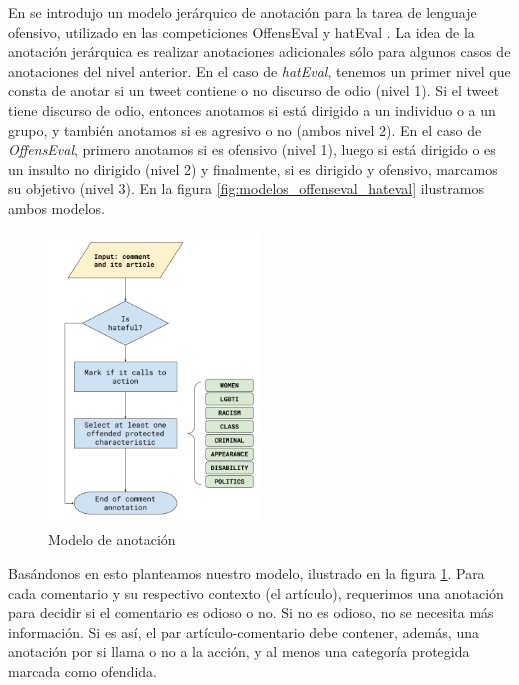 En \citet{zampieri2019predicting} se introdujo un modelo jerárquico de anotación para la tarea de lenguaje ofensivo, utilizado en las competiciones OffensEval \cite{zampieri2019semeval2019} y hatEval \cite{hateval2019semeval}. La idea de la anotación jerárquica es realizar anotaciones adicionales sólo para algunos casos de anotaciones del nivel anterior. En el caso de \emph{hatEval}, tenemos un primer nivel que consta de anotar si un tweet contiene o no discurso de odio (nivel 1). Si el tweet tiene discurso de odio, entonces anotamos si está dirigido a un individuo o a un grupo, y también anotamos si es agresivo o no (ambos nivel 2). En el caso de \emph{OffensEval}, primero anotamos si es ofensivo (nivel 1), luego si está dirigido o es un insulto no dirigido (nivel 2) y finalmente, si es dirigido y ofensivo, marcamos su objetivo (nivel 3). En la figura \ref{fig:modelos_offenseval_hateval} ilustramos ambos modelos.


%
%
%



\begin{figure}
    \centering
    \includegraphics[width=0.5\textwidth]{img/Annotation Model.png}
    \caption{Modelo de anotación}
    \label{fig:annotation_model}
\end{figure}


Basándonos en esto planteamos nuestro modelo, ilustrado en la figura \ref{fig:annotation_model}. Para cada comentario y su respectivo contexto (el artículo), requerimos una anotación para decidir si el comentario es odioso o no. Si no es odioso, no se necesita más información. Si es así, el par artículo-comentario debe contener, además, una anotación por si llama o no a la acción, y al menos una categoría protegida marcada como ofendida.


